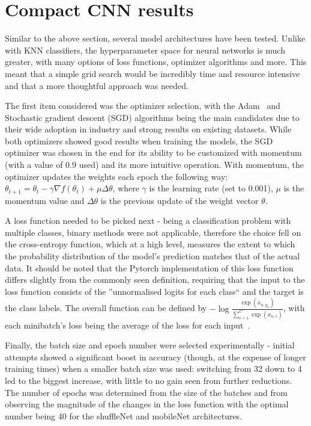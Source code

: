 \section{Compact CNN results}
\label{sec:compact-cnn-results}
Similar to the above section, several model architectures have been tested.
Unlike with KNN classifiers, the hyperparameter space for neural networks is much greater, with many options of loss functions,
optimizer algorithms and more.
This meant that a simple grid search would be incredibly time and resource intensive and that a more thoughtful approach was needed.

The first item considered was the optimizer selection, with the Adam~\cite{adamGrad} and Stochastic gradient descent (SGD) algorithms being
the main candidates due to their wide adoption in industry and strong results on existing datasets.
While both optimizers showed good results when training the models, the SGD optimizer was chosen in the end for its ability
to be customized with momentum (with a value of 0.9 used) and its more intuitive operation.
With momentum, the optimizer updates the weights each epoch the following way:
$\theta_{t+1}=\theta_{t} - \gamma\nabla{f(\theta_{t})}+\mu\Delta\theta$, where $\gamma$ is the learning rate (set to 0.001),
$\mu$ is the momentum value and $\Delta\theta$ is the previous update of the weight vector $\theta$.

A loss function needed to be picked next - being a classification problem with multiple classes, binary methods were not applicable,
therefore the choice fell on the cross-entropy function, which at a high level, measures the extent to which the
probability distribution of the model's prediction matches that of the actual data.
It should be noted that the Pytorch implementation of this loss function differs slightly from the commonly seen definition,
requiring that the input to the loss function consists of the ''unnormalised logits for each class`` and the target is the class labels.
The overall function can be defined by $-\log{\frac{\exp(x_{n, y_{n}})}{\sum_{c=1}^C\exp(x_{n, c})}}$,
with each minibatch's loss being the average of the loss for each input~\cite{pytorchLibrary}.

Finally, the batch size and epoch number were selected experimentally - initial attempts showed a significant boost in accuracy
(though, at the expense of longer training times) when a smaller batch size was used: switching from 32 down to 4 led
to the biggest increase, with little to no gain seen from further reductions.
The number of epochs was determined from the size of the batches and from observing the magnitude of the changes in the loss function
with the optimal number being 40 for the shuffleNet and mobileNet architectures.

